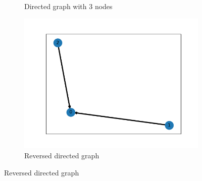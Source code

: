 \documentclass{article}
\begin{document}
\begin{problem}
\begin{enumerate}
\begin{figure}[!h]
\begin{subfigure}{0.35\textwidth}
                \caption{Directed graph with 3 nodes}
            \end{subfigure}
            \begin{subfigure}{0.35\textwidth}
                \includegraphics[width=\textwidth]{./img/p2_2.png}
                \caption{Reversed directed graph}
            \end{subfigure}
        \end{figure}
        

\end{enumerate}
\end{problem}
\end{document}
